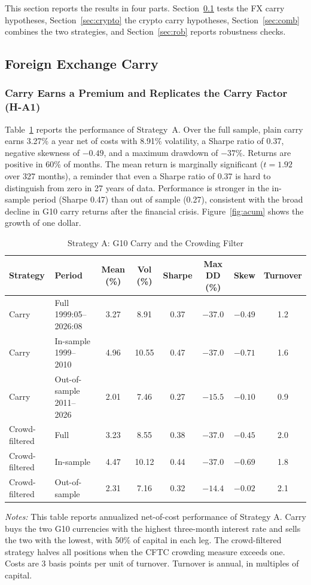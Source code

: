 \documentclass[11pt]{article}
\newcommand{\tabnote}[1]{\par\vspace{0.3em}\begin{minipage}{\linewidth}\footnotesize\setstretch{1.0}\textit{Notes:} #1\end{minipage}}
\begin{document}
This section reports the results in four parts. Section~\ref{sec:fx} tests the FX carry hypotheses, Section~\ref{sec:crypto} the crypto carry hypotheses, Section~\ref{sec:comb} combines the two strategies, and Section~\ref{sec:rob} reports robustness checks.

\subsection{Foreign Exchange Carry}\label{sec:fx}

\subsubsection{Carry Earns a Premium and Replicates the Carry Factor (H-A1)}

Table~\ref{tab:A} reports the performance of Strategy~A. Over the full sample, plain carry earns 3.27\% a year net of costs with 8.91\% volatility, a Sharpe ratio of 0.37, negative skewness of $-0.49$, and a maximum drawdown of $-37$\%. Returns are positive in 60\% of months. The mean return is marginally significant ($t=1.92$ over 327 months), a reminder that even a Sharpe ratio of 0.37 is hard to distinguish from zero in 27 years of data. Performance is stronger in the in-sample period (Sharpe 0.47) than out of sample (0.27), consistent with the broad decline in G10 carry returns after the financial crisis. Figure~\ref{fig:acum} shows the growth of one dollar.

\begin{table}[!htbp]
\centering
\caption{Strategy A: G10 Carry and the Crowding Filter}\label{tab:A}
\small\setlength{\tabcolsep}{4pt}
\begin{tabular}{llcccccc}
\toprule
Strategy & Period & Mean (\%) & Vol (\%) & Sharpe & Max DD (\%) & Skew & Turnover \\
\midrule
Carry & Full 1999:05--2026:08 & 3.27 & 8.91 & 0.37 & $-37.0$ & $-0.49$ & 1.2 \\
Carry & In-sample 1999--2010 & 4.96 & 10.55 & 0.47 & $-37.0$ & $-0.71$ & 1.6 \\
Carry & Out-of-sample 2011--2026 & 2.01 & 7.46 & 0.27 & $-15.5$ & $-0.10$ & 0.9 \\
\addlinespace
Crowd-filtered & Full & 3.23 & 8.55 & 0.38 & $-37.0$ & $-0.45$ & 2.0 \\
Crowd-filtered & In-sample & 4.47 & 10.12 & 0.44 & $-37.0$ & $-0.69$ & 1.8 \\
Crowd-filtered & Out-of-sample & 2.31 & 7.16 & 0.32 & $-14.4$ & $-0.02$ & 2.1 \\
\bottomrule
\end{tabular}
\tabnote{This table reports annualized net-of-cost performance of Strategy A. Carry buys the two G10 currencies with the highest three-month interest rate and sells the two with the lowest, with 50\% of capital in each leg. The crowd-filtered strategy halves all positions when the CFTC crowding measure exceeds one. Costs are 3 basis points per unit of turnover. Turnover is annual, in multiples of capital.}
\end{table}
\end{document}
